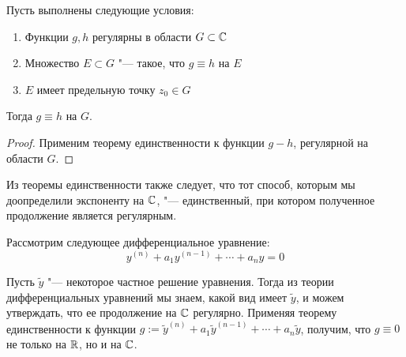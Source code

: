 \pagebreak
\begin{corollary}
	Пусть выполнены следующие условия:
	\begin{enumerate}
		\item Функции $g, h$ регулярны в области $G \subset \mathbb{C}$
		\item Множество $E \subset G$ "--- такое, что $g \equiv h$ на $E$
		\item $E$ имеет предельную точку $z_0 \in G$
	\end{enumerate}
	
	Тогда $g \equiv h$ на $G$.
\end{corollary}

\begin{proof}
	Применим теорему единственности к функции $g - h$, регулярной на области $G$.
\end{proof}

\begin{note}
	Из теоремы единственности также следует, что тот способ, которым мы доопределили экспоненту на $\mathbb{C}$, "--- единственный, при котором полученное продолжение является регулярным.
\end{note}

\begin{example}
	Рассмотрим следующее дифференциальное уравнение:
	\[y^{(n)} + a_1y^{(n-1)} + \dotsb + a_ny = 0\]
	
	Пусть $\widetilde y$ "--- некоторое частное решение уравнения. Тогда из теории дифференциальных уравнений мы знаем, какой вид имеет $\widetilde y$, и можем утверждать, что ее продолжение на $\mathbb{C}$ регулярно. Применяя теорему единственности к функции $g := \widetilde y^{(n)} + a_1\widetilde y^{(n-1)} + \dotsb + a_n\widetilde y$, получим, что $g \equiv 0$ не только на $\mathbb{R}$, но и на $\mathbb{C}$.
\end{example}